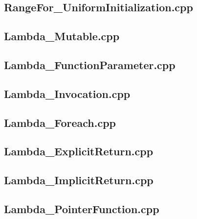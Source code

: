 \documentclass[11pt]{report}
\begin{document}
\begin{appendix}
\subsection{RangeFor\_UniformInitialization.cpp}
\label{RangeFor_UniformInitialization}


\subsection{Lambda\_Mutable.cpp}
\label{Lambda_Mutable}


\subsection{Lambda\_FunctionParameter.cpp}
\label{Lambda_FunctionParameter}


\subsection{Lambda\_Invocation.cpp}
\label{Lambda_Invocation}


\subsection{Lambda\_Foreach.cpp}
\label{Lambda_Foreach}


\subsection{Lambda\_ExplicitReturn.cpp}
\label{Lambda_ExplicitReturn}


\subsection{Lambda\_ImplicitReturn.cpp}
\label{Lambda_ImplicitReturn}


\subsection{Lambda\_PointerFunction.cpp}
\label{Lambda_PointerFunction}



\end{appendix}
\end{document}
